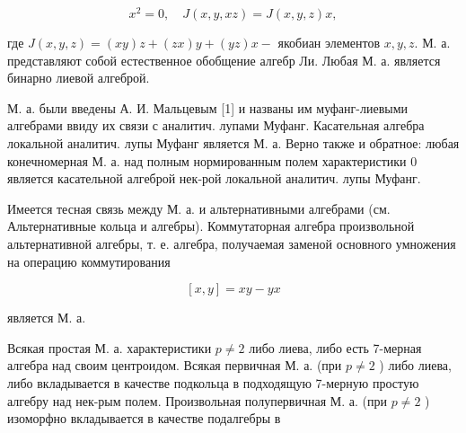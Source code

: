 \documentclass[10pt]{article}
\begin{document}
\[

x^{2}=0, \quad J(x, y, x z)=J(x, y, z) x,

\]



где $J(x, y, z)=(x y) z+(z x) y+(y z) x-$ якобиан элементов $x, y, z$. М. а. представляют собой естественное обобщение алгебр Ли. Любая М. а. является бинарно лиевой алгеброй.



М. а. были введены А. И. Мальцевым [1] и названы им муфанг-лиевыми алгебрами ввиду их связи с аналитич. лупами Муфанг. Касательная алгебра локальной аналитич. лупы Муфанг является М. а. Верно также и обратное: любая конечномерная М. а. над полным нормированным полем характеристики 0 является касательной алгеброй нек-рой локальной аналитич. лупы Муфанг.



Имеется тесная связь между М. а. и альтернативными алгебрами (см. Альтернативные кольца и алгебры). Коммутаторная алгебра произвольной альтернативной алгебры, т. е. алгебра, получаемая заменой основного умножения на операцию коммутирования



\[

[x, y]=x y-y x

\]



является М. а.



Всякая простая М. а. характеристики $p \neq 2$ либо лиева, либо есть 7-мерная алгебра над своим центроидом. Всякая первичная М. а. (при $p \neq 2$ ) либо лиева, либо вкладывается в качестве подкольца в подходящую 7-мерную простую алгебру над нек-рым полем. Произвольная полупервичная М. а. (при $p \neq 2$ ) изоморфно вкладывается в качестве подалгебры в
\end{document}
